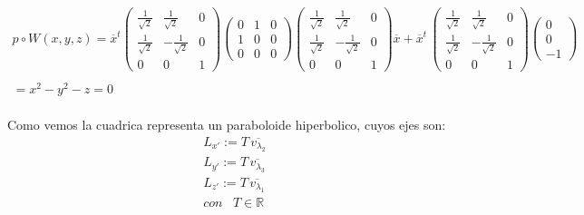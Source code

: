 \documentclass[11pt,letterpaper]{article}
\newcommand{\R}{\mathbb{R}}
\begin{document}
    \begin{align*}
        p\circ W(x,y,z)=\overline{x}^t  \begin{pmatrix}
                \frac{1}{\sqrt{2}} & \frac{1}{\sqrt{2}} & 0\\
                 \frac{1}{\sqrt{2}}&- \frac{1}{\sqrt{2}}& 0\\
                 0& 0 &1
                \end{pmatrix}
                \begin{pmatrix}
                0 & 1 & 0\\
                1 & 0 & 0\\
                0 & 0 & 0
                \end{pmatrix}
                \begin{pmatrix}
                \frac{1}{\sqrt{2}} & \frac{1}{\sqrt{2}} & 0\\
                 \frac{1}{\sqrt{2}}&- \frac{1}{\sqrt{2}}& 0\\
                 0& 0 &1
                \end{pmatrix}\overline{x}+\overline{x}^t\, \begin{pmatrix}
                \frac{1}{\sqrt{2}} & \frac{1}{\sqrt{2}} & 0\\
                 \frac{1}{\sqrt{2}}&- \frac{1}{\sqrt{2}}& 0\\
                 0& 0 &1
                \end{pmatrix}
                \begin{pmatrix}
                0 \\
                0\\
                -1
                \end{pmatrix}\,\\
                \,\\
                =x^2-y^2-z=0
    \end{align*}\,\\
    Como vemos la cuadrica representa un paraboloide hiperbolico, cuyos ejes son:\,\\
    \begin{align*}
        L_{x'}:=T\,\overline{v_{\lambda_2}}\,\\
        L_{y'}:=T\,\overline{v_{\lambda_3}}\,\\
        L_{z'}:=T\,\overline{v_{\lambda_1}}\,\\
        con\,\,\,\,\,T\in \R
    \end{align*}\,\\
\end{document}
